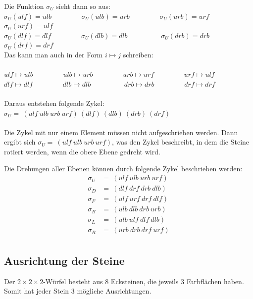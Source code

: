 \documentclass[12pt,a4paper, usenames, dvipsnames]{article}
\begin{document}
{Die Funktion $\sigma_U$ sieht dann so aus: \\

$\sigma_U(ulf)=ulb$ \ \ \ \ \ \ \ \ $\sigma_U(ulb)=urb$ \ \ \ \ \ \ \ \ $\sigma_U(urb)=urf$ \ \ \ \ \ \ \ \ $\sigma_U(urf)=ulf$ \\
$\sigma_U(dlf)=dlf$ \ \ \ \ \ \ \ \ $\sigma_U(dlb)=dlb$ \ \ \ \ \ \ \ \ \ $\sigma_U(drb)=drb$ \ \ \ \ \ \ \ \ $\sigma_U(drf)=drf$} 
\\

Das kann man auch in der Form $i \mapsto j$ schreiben: \\
\\
$ulf \mapsto ulb$ \ \ \ \ \ \ \ \ $ulb \mapsto urb$ \ \ \ \ \ \ \ \ $urb \mapsto urf$ \ \ \ \ \ \ \ \ $urf \mapsto ulf$ \\
$dlf \mapsto dlf$ \ \ \ \ \ \ \ \ $dlb \mapsto dlb$ \ \ \ \ \ \ \ \ \ $drb \mapsto drb$ \ \ \ \ \ \ \ \ $drf \mapsto drf$ \\
\\
Daraus entstehen folgende Zykel: $\sigma_U = \ (ulf \ ulb \ urb \ urf)\ (dlf)\ (dlb)\ (drb)\ (drf)$ \\ \\
Die Zykel mit nur einem Element müssen nicht aufgeschrieben werden. Dann ergibt sich $\sigma_U = \ (ulf \ ulb \ urb \ urf)$, was den Zykel beschreibt, in dem die Steine rotiert werden, wenn die obere Ebene gedreht wird. 


Die Drehungen aller Ebenen können durch folgende Zykel beschrieben werden: 
\begin{align*}
\sigma_U & =\ (ulf \ ulb \ urb \ urf) \\
\sigma_D & =\ (dlf \ drf \ drb \ dlb) \\
\sigma_F & =\ (ulf \ urf \ drf \ dlf) \\
\sigma_B & =\ (ulb \ dlb \ drb \ urb) \\
\sigma_L & =\ (ulb \ ulf \ dlf \ dlb) \\
\sigma_R & =\ (urb \ drb \ drf \ urf) \\
\end{align*}

%
%
%
%
%
%
%
%
%
%
%
%
%
%
%
%
%
%
%
%
\subsection*{Ausrichtung der Steine} 
Der $2\times 2\times 2$-Würfel besteht aus 8 Ecksteinen, die jeweils 3 Farbflächen haben. Somit hat jeder Stein 3 mögliche Ausrichtungen. 
\end{document}
